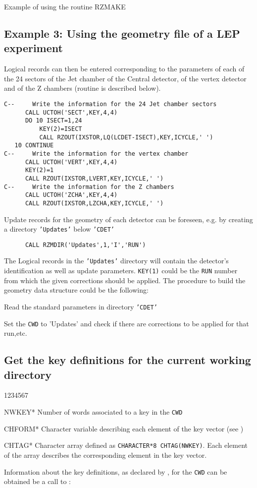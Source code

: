\begin{XMPt}{Example of using the routine RZMAKE}
\subsection{Example 3: Using the geometry file of a LEP experiment}
\par Logical records can then be entered corresponding to the parameters
of each of the 24 sectors of the Jet chamber of the Central detector,
of the vertex detector and of the Z chambers
(routine  is described below).
\begin{verbatim}
C--     Write the information for the 24 Jet chamber sectors
      CALL UCTOH('SECT',KEY,4,4)
      DO 10 ISECT=1,24
          KEY(2)=ISECT
          CALL RZOUT(IXSTOR,LQ(LCDET-ISECT),KEY,ICYCLE,' ')
   10 CONTINUE
C--     Write the information for the vertex chamber
      CALL UCTOH('VERT',KEY,4,4)
      KEY(2)=1
      CALL RZOUT(IXSTOR,LVERT,KEY,ICYCLE,' ')
C--     Write the information for the Z chambers
      CALL UCTOH('ZCHA',KEY,4,4)
      CALL RZOUT(IXSTOR,LZCHA,KEY,ICYCLE,' ')
\end{verbatim}
Update records for the geometry of each detector can be foreseen, e.g.
by creating a directory {\tt'Updates'} below {\tt'CDET'}
\begin{verbatim}
      CALL RZMDIR('Updates',1,'I','RUN')
\end{verbatim}
The Logical records in the {\tt'Updates'} directory will contain the
detector's identification as well as update parameters. {\tt KEY(1)} could be
the {\tt RUN} number from which the given corrections should be applied.
The procedure to build the geometry data structure could be the following:
\begin{UL}
\item Read the standard parameters in directory {\tt'CDET'}
\item Set the {\tt CWD} to 'Updates' and check if there are corrections
to be applied for that run,etc.
\end{UL}
\subsection{Get the key definitions for the current working directory}
\Odesc
\begin{DLtt}{1234567}
\item[NWKEY*]Number of words associated to a key in the {\tt CWD}
\item[CHFORM*]Character variable describing each element of the key vector
(see )
\item[CHTAG*]Character array defined as {\tt CHARACTER*8 CHTAG(NWKEY)}.
\newline Each element of the array describes the corresponding
element in the key vector.
\end{DLtt}
\par 
Information about the key definitions, as declared by ,
for the {\tt CWD} can be obtained be a call to :

\end{XMPt}
